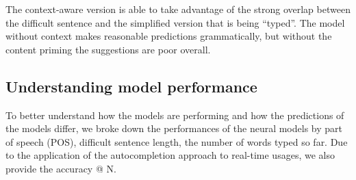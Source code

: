 \documentclass[11pt]{article}
\begin{document}
\noindent The context-aware version is able to take advantage of the strong overlap between the difficult sentence and the simplified version that is being ``typed''.  The model without context makes reasonable predictions grammatically, but without the content priming the suggestions are poor overall.

\begin{table}[t]
\centering
{}
\caption{\label{tab:context_information} Sample output for simplifying the difficult sentence ``\textit{Each pseudostem can produce a single bunch of bananas.}'' using GPT-2 with and without context.  ``Actual'' indicates the word that should be predicted.}
\end{table}

\subsection{Understanding model performance}

To better understand how the models are performing and how the predictions of the models differ, we broke down the performances of the neural models by part of speech (POS), difficult sentence length, the number of words typed so far. Due to the application of the autocompletion approach to real-time usages, we also provide the accuracy @ N.
\end{document}
